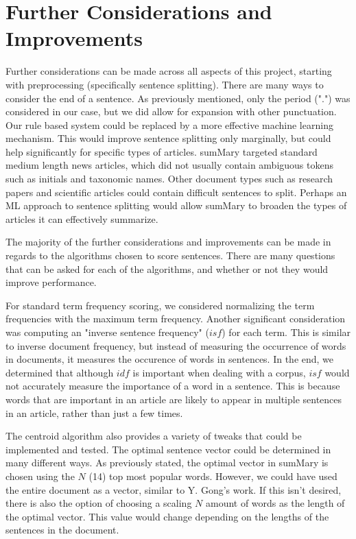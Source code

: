 \documentclass[11pt,a4paper]{article}
\begin{document}
  \section{Further Considerations and Improvements}
  Further considerations can be made across all aspects of this project, starting with preprocessing (specifically sentence splitting). There are many ways to consider the end of a sentence. As previously mentioned, only the period (".") was considered in our case, but we did allow for expansion with other punctuation. Our rule based system could be replaced by a more effective machine learning mechanism. This would improve sentence splitting only marginally, but could help significantly for specific types of articles. sumMary targeted standard medium length news articles, which did not usually contain ambiguous tokens such as initials and taxonomic names. Other document types such as research papers and scientific articles could contain difficult sentences to split. Perhaps an ML approach to sentence splitting would allow sumMary to broaden the types of articles it can effectively summarize.

  The majority of the further considerations and improvements can be made in regards to the algorithms chosen to score sentences. There are many questions that can be asked for each of the algorithms, and whether or not they would improve performance.

  For standard term frequency scoring, we considered normalizing the term frequencies with the maximum term frequency. Another significant consideration was computing an "inverse sentence frequency" ($isf$) for each term. This is similar to inverse document frequency, but instead of measuring the occurrence of words in documents, it measures the occurence of words in sentences. In the end, we determined that although $idf$ is important when dealing with a corpus, $isf$ would not accurately measure the importance of a word in a sentence. This is because words that are important in an article are likely to appear in multiple sentences in an article, rather than just a few times.

  The centroid algorithm also provides a variety of tweaks that could be implemented and tested. The optimal sentence vector could be determined in many different ways. As previously stated, the optimal vector in sumMary is chosen using the $N$ (14) top most popular words. However, we could have used the entire document as a vector, similar to Y. Gong's work. If this isn't desired, there is also the option of choosing a scaling $N$ amount of words as the length of the optimal vector. This value would change depending on the lengths of the sentences in the document.
\end{document}
